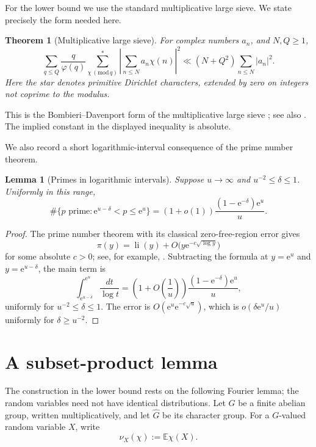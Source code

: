 \documentclass[11pt]{amsart}
\newtheorem{theorem}{Theorem}[section]
\newtheorem{lemma}[lemma]{Lemma}
\theoremstyle{definition}
\theoremstyle{remark}
\numberwithin{equation}{section}
\newcommand{\e}{\mathrm e}
\begin{document}
For the lower bound we use the standard multiplicative large sieve.  We state precisely the form needed here.

\begin{theorem}[Multiplicative large sieve]\label{thm:large-sieve}
For complex numbers $a_n$, and $N,Q\ge1$,
\[
 \sum_{q\le Q}\frac q{\varphi(q)}
 \sum_{\chi\, (\mathrm{mod}\,q)}^{*}
 \left|\sum_{n\le N}a_n\chi(n)\right|^2
 \ll (N+Q^2)\sum_{n\le N}|a_n|^2.
\]
Here the star denotes primitive Dirichlet characters, extended by zero on integers not coprime to the modulus.
\end{theorem}

This is the Bombieri--Davenport form of the multiplicative large sieve \cite{BombieriDavenport1969}; see also \cite[Section 7.4]{IwaniecKowalski2004}.  The implied constant in the displayed inequality is absolute.

We also record a short logarithmic-interval consequence of the prime number theorem.

\begin{lemma}[Primes in logarithmic intervals]\label{lem:pnt-layer}
Suppose $u\to\infty$ and $u^{-2}\le\delta\le1$.  Uniformly in this range,
\[
 \#\{p\text{ prime}:\e^{u-\delta}<p\le\e^u\}
 =(1+o(1))\frac{(1-\e^{-\delta})\e^u}{u}.
\]
\end{lemma}

\begin{proof}
The prime number theorem with its classical zero-free-region error gives
\[
 \pi(y)=\operatorname{li}(y)+O\bigl(y\e^{-c\sqrt{\log y}}\bigr)
\]
for some absolute $c>0$; see, for example, \cite[Chapter 6]{MontgomeryVaughan2007}.  Subtracting the formula at $y=\e^u$ and $y=\e^{u-\delta}$, the main term is
\[
 \int_{\e^{u-\delta}}^{\e^u}\frac{dt}{\log t}
 =\left(1+O\!\left(\frac1u\right)\right)
 \frac{(1-\e^{-\delta})\e^u}{u},
\]
uniformly for $u^{-2}\le\delta\le1$.
The error is $O(\e^u\e^{-c\sqrt u})$, which is $o(\delta\e^u/u)$ uniformly for $\delta\ge u^{-2}$.
\end{proof}

\section{A subset-product lemma}

The construction in the lower bound rests on the following Fourier lemma;
the random variables need not have identical distributions.  Let $G$ be
a finite abelian group, written multiplicatively, and let $\widehat G$ be
its character group.  For a
$G$-valued random variable $X$, write
\[
 \widehat\nu_X(\chi):=\mathbb E\chi(X).
\]
\end{document}
